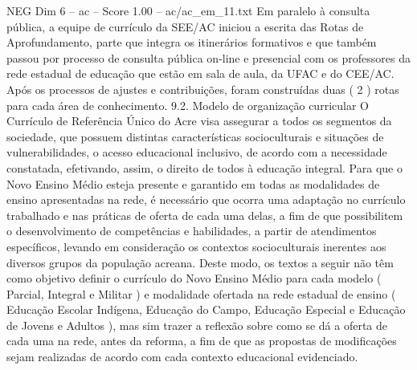 \begin{textsample}{NEG Dim 6 – ac – Score 1.00 – ac/ac\_em\_11.txt}
Em paralelo à consulta pública, a equipe de currículo da SEE/AC iniciou a escrita das Rotas de Aprofundamento, parte que integra os itinerários formativos e que também passou por processo de consulta pública on-line e presencial com os professores da rede estadual de educação que estão em sala de aula, da UFAC e do CEE/AC.
Após os processos de ajustes e contribuições, foram construídas duas ( 2 ) rotas para cada área de conhecimento. 9.2.
Modelo de organização curricular O Currículo de Referência Único do Acre visa assegurar a todos os segmentos da sociedade, que possuem distintas características socioculturais e situações de vulnerabilidades, o acesso educacional inclusivo, de acordo com a necessidade constatada, efetivando, assim, o direito de todos à educação integral.
Para que o Novo Ensino Médio esteja presente e garantido em todas as modalidades de ensino apresentadas na rede, é necessário que ocorra uma adaptação no currículo trabalhado e nas práticas de oferta de cada uma delas, a fim de que possibilitem o desenvolvimento de competências e habilidades, a partir de atendimentos específicos, levando em consideração os contextos socioculturais inerentes aos diversos grupos da população acreana.
Deste modo, os textos a seguir não têm como objetivo definir o currículo do Novo Ensino Médio para cada modelo ( Parcial, Integral e Militar ) e modalidade ofertada na rede estadual de ensino ( Educação Escolar Indígena, Educação do Campo, Educação Especial e Educação de Jovens e Adultos ), mas sim trazer a reflexão sobre como se dá a oferta de cada uma na rede, antes da reforma, a fim de que as propostas de modificações sejam realizadas de acordo com cada contexto educacional evidenciado.

\end{textsample}
